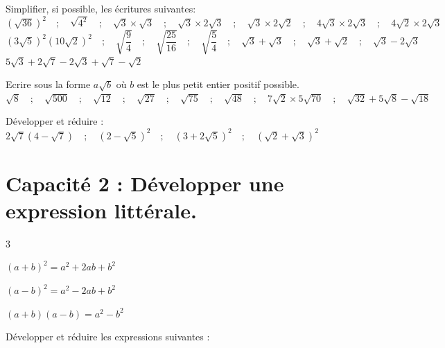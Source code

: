 \documentclass[10pt,a4paper]{article}  %
\begin{document}
\begin{enumMet}
  \item Simplifier, si possible, les écritures suivantes:\\
  $(\sqrt{36})^{2}\quad;\quad\sqrt{4^{2}}\quad;\quad\sqrt{3} \times \sqrt{3}\quad;\quad \sqrt{3} \times 2 \sqrt{3}\quad;\quad\sqrt{3} \times 2 \sqrt{2}\quad;\quad4 \sqrt{3} \times 2 \sqrt{3}\quad;\quad4 \sqrt{2} \times 2 \sqrt{3}$\\
  $(3 \sqrt{5})^{2} (10 \sqrt{2})^{2}\quad;\quad\sqrt{\dfrac{9}{4}}\quad;\quad\sqrt{\dfrac{25}{16}}\quad;\quad\sqrt{\dfrac{5}{4}}\quad;\quad\sqrt{3}+\sqrt{3}\quad;\quad\sqrt{3}+\sqrt{2}\quad;\quad\sqrt{3}-2 \sqrt{3}$\\
  $5 \sqrt{3}+2 \sqrt{7}-2 \sqrt{3}+\sqrt{7}-\sqrt{2}$
  \item Ecrire sous la forme $a \sqrt{b}$ où $b$ est le plus petit entier positif possible.\\
  $\sqrt{8}\quad;\quad\sqrt{500}\quad;\quad\sqrt{12}\quad;\quad\sqrt{27}\quad;\quad \sqrt{75}\quad;\quad\sqrt{48}\quad;\quad7 \sqrt{2} \times 5 \sqrt{70}\quad;\quad \sqrt{32}+5 \sqrt{8}-\sqrt{18}$
  \item Développer et réduire :\\
  $2 \sqrt{7}(4-\sqrt{7})\quad;\quad(2-\sqrt{5})^{2}\quad;\quad(3+2 \sqrt{5})^{2}\quad;\quad(\sqrt{2}+\sqrt{3})^{2}$
\end{enumMet}

\vspace*{-0.6cm}
\section*{Capacité 2 : Développer une expression littérale.}

\begin{brappel}
	\begin{multicols}{3}
		\begin{itemMet}
		\item $(a+b)^{2}=a^{2}+2 a b+b^{2}$
		\item $(a-b)^{2}=a^{2}-2 a b+b^{2}$
		\item $(a+b)(a-b)=a^{2}-b^{2}$
	\end{itemMet}
	\end{multicols}
\end{brappel}
\vspace*{-0.6cm}
Développer et réduire les expressions suivantes :
\end{document}

